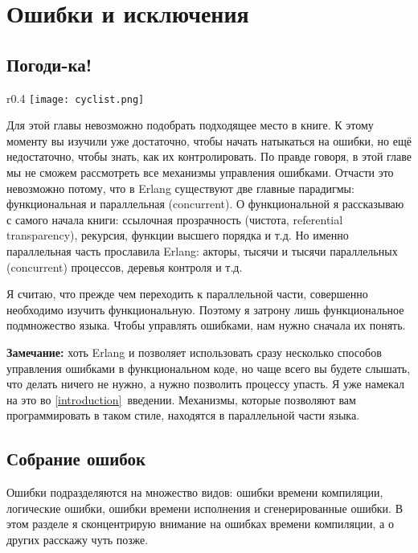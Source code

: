 \chapter{Ошибки и исключения}
\label{errors-and-exceptions}
\section{Погоди\--ка!}
\label{not-so-fast}
\begin{wrapfigure}{r}{0.4\linewidth}
    \texttt{[image: cyclist.png]}
\end{wrapfigure}
Для этой главы невозможно подобрать подходящее место в книге.
К этому моменту вы изучили уже достаточно, чтобы начать натыкаться на ошибки, но ещё недостаточно, чтобы знать, как их контролировать.
По правде говоря, в этой главе мы не сможем рассмотреть все механизмы управления ошибками.
Отчасти это невозможно потому, что в Erlang существуют две главные парадигмы: функциональная и параллельная (concurrent).
О функциональной я рассказываю с самого начала книги: ссылочная прозрачность (чистота, referential transparency), рекурсия, функции высшего порядка и т.д.
Но именно параллельная часть прославила Erlang: акторы, тысячи и тысячи параллельных (concurrent) процессов, деревья контроля и т.д.

Я считаю, что прежде чем переходить к параллельной части, совершенно необходимо изучить функциональную.
Поэтому я затрону лишь функциональное подмножество языка.
Чтобы управлять ошибками, нам нужно сначала их понять.\\
\colorbox{lgray}
{
\begin{minipage}{1.0\linewidth}
    \textbf{Замечание:} хоть Erlang и позволяет использовать сразу несколько способов управления ошибками в функциональном коде, но чаще всего вы будете слышать, что делать ничего не нужно, а нужно позволить процессу упасть.
    Я уже намекал на это во \ref{introduction}~введении.
    Механизмы, которые позволяют вам программировать в таком стиле, находятся в параллельной части языка.
\end{minipage}
}
\section{Собрание ошибок}
\label{a-compilation-of-errors}
Ошибки подразделяются на множество видов: ошибки времени компиляции, логические ошибки, ошибки времени исполнения и сгенерированные ошибки.
В этом разделе я сконцентрирую внимание на ошибках времени компиляции, а о других расскажу чуть позже.

